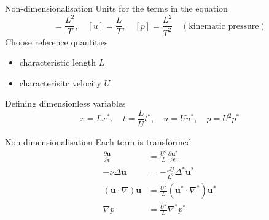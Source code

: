 \documentclass[aspectratio=169]{beamer}
\begin{document}

\begin{frame}{\Large Non-dimensionalisation}
  \Large
  Units for the terms in the equation
  \begin{equation*}
    [\nu] = \frac{L^2}{T}, \quad [u] = \frac{L}{T}, \quad [p] = \frac{L^2}{T^2} \quad (\text{kinematic pressure})
  \end{equation*}
  \pause
  Choose reference quantities
  \begin{itemize}
    \item characteristic length $L$
    \item characterisitc velocity $U$
  \end{itemize}
  \pause
  Defining dimensionless variables 
  \begin{equation*}
    x = L x^*, \quad t = \frac{L}{U} t^*, \quad u = U u^*, \quad p = U^2 p^*
  \end{equation*}
\end{frame}

\begin{frame}{\Large Non-dimensionalisation}
  \Large
  Each term is transformed
  \begin{align*}
    \frac{\partial \mathbf{u}}{\partial t} &= \frac{U^2}{L} \frac{\partial \mathbf{u}^*}{\partial t} \\
    -\nu \Delta \mathbf{u} &= -\frac{\nu U}{L^2}\Delta^* \mathbf{u}^* \\
    (\mathbf{u} \cdot \nabla) \mathbf{u} &= \frac{U^2}{L} (\mathbf{u}^* \cdot \nabla^*) \mathbf{u}^* \\
    \nabla p &= \frac{U^2}{L} \nabla^* p^*
  \end{align*}
\end{frame}
\end{document}
